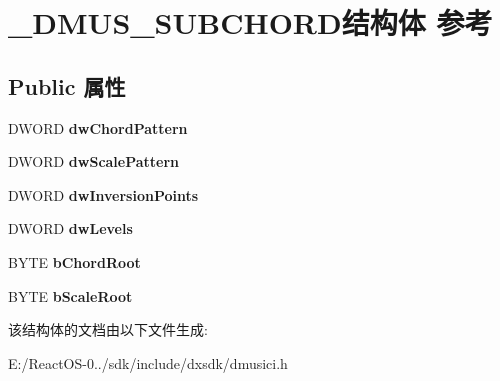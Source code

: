 \hypertarget{struct___d_m_u_s___s_u_b_c_h_o_r_d}{}\section{\+\_\+\+D\+M\+U\+S\+\_\+\+S\+U\+B\+C\+H\+O\+R\+D结构体 参考}
\label{struct___d_m_u_s___s_u_b_c_h_o_r_d}
\subsection*{Public 属性}
\begin{DoxyCompactItemize}
\item 
\mbox{\label{struct___d_m_u_s___s_u_b_c_h_o_r_d_a08fbe3cf8f985f8f3ed34024805e28f2}} 
D\+W\+O\+RD {\bfseries dw\+Chord\+Pattern}
\item 
\mbox{\label{struct___d_m_u_s___s_u_b_c_h_o_r_d_a5a1c17fcbc2dfa7c678d6692fd2e2cf8}} 
D\+W\+O\+RD {\bfseries dw\+Scale\+Pattern}
\item 
\mbox{\label{struct___d_m_u_s___s_u_b_c_h_o_r_d_a04d38fcf50a7372f9c6b7ef6377f7d53}} 
D\+W\+O\+RD {\bfseries dw\+Inversion\+Points}
\item 
\mbox{\label{struct___d_m_u_s___s_u_b_c_h_o_r_d_ace24f47d2455e0fa26b5a7f86048db6c}} 
D\+W\+O\+RD {\bfseries dw\+Levels}
\item 
\mbox{\label{struct___d_m_u_s___s_u_b_c_h_o_r_d_a047c64271fece7b5c6f3c33789ad5402}} 
B\+Y\+TE {\bfseries b\+Chord\+Root}
\item 
\mbox{\label{struct___d_m_u_s___s_u_b_c_h_o_r_d_a01737de05689d444f59b9f561abf2c05}} 
B\+Y\+TE {\bfseries b\+Scale\+Root}
\end{DoxyCompactItemize}


该结构体的文档由以下文件生成\+:\begin{DoxyCompactItemize}
\item 
E\+:/\+React\+O\+S-\/0../sdk/include/dxsdk/dmusici.\+h\end{DoxyCompactItemize}
